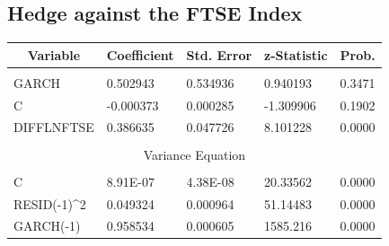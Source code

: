 \documentclass[11pt]{report}
\begin{document}
	\subsection*{Hedge against the FTSE Index}
\begin{table}[!h]
\centering
\begin{tabular}{lllll}
\hline
\multicolumn{1}{|c|}{Variable} & \multicolumn{1}{|c|}{Coefficient} & \multicolumn{1}{|c|}{Std. Error} & \multicolumn{1}{|c|}{z-Statistic} & \multicolumn{1}{|c|}{Prob.} \\ \hline
                               &                                  &                                 &                                  &                            \\
GARCH                          & 0.502943                         & 0.534936                        & 0.940193                         & 0.3471                     \\
C                              & -0.000373                        & 0.000285                        & -1.309906                        & 0.1902                     \\
DIFFLNFTSE                     & 0.386635                         & 0.047726                        & 8.101228                         & 0.0000                     \\
                               &                                  &                                 &                                  &                            \\ \hline
\multicolumn{5}{|c|}{Variance Equation}                                                                                                                             \\ \hline
                               &                                  &                                 &                                  &                            \\
C                              & 8.91E-07                         & 4.38E-08                        & 20.33562                         & 0.0000                     \\
RESID(-1)\textasciicircum 2    & 0.049324                         & 0.000964                        & 51.14483                         & 0.0000                     \\
GARCH(-1)                      & 0.958534                         & 0.000605                        & 1585.216                         & 0.0000                    
\end{tabular}
\end{table}
\bigbreak
\end{document}
